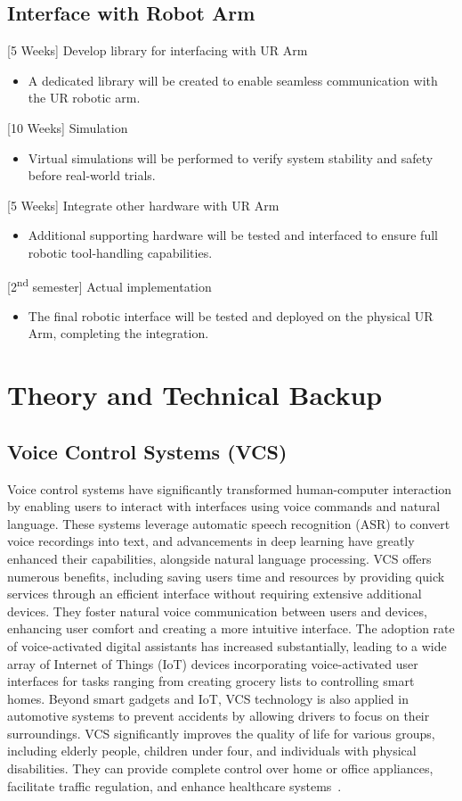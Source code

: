 \documentclass[12pt]{extarticle}
\begin{document}
\subsection{Interface with Robot Arm}
[5 Weeks] Develop library for interfacing with UR Arm
\begin{itemize}
    \item A dedicated library will be created to enable seamless communication with the UR robotic arm.
\end{itemize}
[10 Weeks] Simulation
\begin{itemize}
    \item Virtual simulations will be performed to verify system stability and safety before real-world trials.
\end{itemize}
[5 Weeks] Integrate other hardware with UR Arm
\begin{itemize}
    \item Additional supporting hardware will be tested and interfaced to ensure full robotic tool-handling capabilities.
\end{itemize}
[2\textsuperscript{nd} semester] Actual implementation
\begin{itemize}
    \item The final robotic interface will be tested and deployed on the physical UR Arm, completing the integration.
\end{itemize}


\newpage
\section{Theory and Technical Backup}

\subsection{Voice Control Systems (VCS)}
Voice control systems have significantly transformed human-computer interaction by enabling users to interact with interfaces using voice commands and natural language. These systems leverage automatic speech recognition (ASR) to convert voice recordings into text, and advancements in deep learning have greatly enhanced their capabilities, alongside natural language processing. VCS offers numerous benefits, including saving users time and resources by providing quick services through an efficient interface without requiring extensive additional devices. They foster natural voice communication between users and devices, enhancing user comfort and creating a more intuitive interface. The adoption rate of voice-activated digital assistants has increased substantially, leading to a wide array of Internet of Things (IoT) devices incorporating voice-activated user interfaces for tasks ranging from creating grocery lists to controlling smart homes. Beyond smart gadgets and IoT, VCS technology is also applied in automotive systems to prevent accidents by allowing drivers to focus on their surroundings. VCS significantly improves the quality of life for various groups, including elderly people, children under four, and individuals with physical disabilities. They can provide complete control over home or office appliances, facilitate traffic regulation, and enhance healthcare systems~\cite{vcs}.
\end{document}
